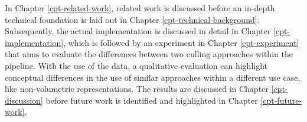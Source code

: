 \noindent
In Chapter \ref{cpt-related-work}, related work is discussed before an in-depth technical foundation 
is laid out in Chapter \ref{cpt-technical-background}. Subsequently, the actual implementation is discussed 
in detail in Chapter \ref{cpt-implementation}, which is followed by an experiment in Chapter \ref{cpt-experiment} 
that aims to evaluate the differences between two culling approaches within the pipeline. With the use of the data, 
a qualitative evaluation can highlight conceptual differences in the use of similar approaches within a different 
use case, like non-volumetric representations. The results are discussed in Chapter \ref{cpt-discussion} before 
future work is identified and highlighted in Chapter \ref{cpt-future-work}. 
